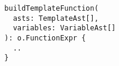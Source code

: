 \begin{verbatim}
  buildTemplateFunction(
    asts: TemplateAst[],
    variables: VariableAst[]
  ): o.FunctionExpr {
    ..
  }
\end{verbatim}
